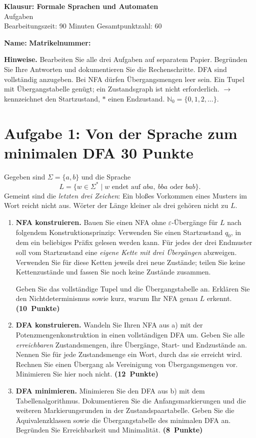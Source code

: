 \documentclass[11pt,a4paper]{article}
\newif\ifloesungen
\newcommand{\punkte}[1]{\hfill\mbox{\textbf{(#1 Punkte)}}}
\begin{document}
\begin{center}
{\LARGE\bfseries Klausur: Formale Sprachen und Automaten}\\[6pt]
{\large\ifloesungen Aufgaben und separate Musterlösungen\else Aufgaben\fi}\\[5pt]
Bearbeitungszeit: 90 Minuten \quad Gesamtpunktzahl: 60
\end{center}
\textbf{Name:} \hrulefill\quad\textbf{Matrikelnummer:} \hrulefill

\textbf{Hinweise.} Bearbeiten Sie alle drei Aufgaben auf separatem Papier.
Begründen Sie Ihre Antworten und dokumentieren Sie die Rechenschritte.
DFA sind vollständig anzugeben. Bei NFA dürfen Übergangsmengen leer sein.
Ein Tupel mit Übergangstabelle genügt; ein Zustandsgraph ist nicht erforderlich.
$\to$ kennzeichnet den Startzustand, $*$ einen Endzustand.
$\mathbb N_0=\{0,1,2,\ldots\}$.

\section*{Aufgabe 1: Von der Sprache zum minimalen DFA \hfill 30 Punkte}
Gegeben sind $\Sigma=\{a,b\}$ und die Sprache
\[
 L=\{w\in\Sigma^*\mid w\text{ endet auf }aba,\ bba\text{ oder }bab\}.
\]
Gemeint sind die \emph{letzten drei Zeichen}: Ein bloßes Vorkommen eines
Musters im Wort reicht nicht aus. Wörter der Länge kleiner als drei gehören
nicht zu $L$.

\begin{enumerate}[label=\alph*)]
\item \textbf{NFA konstruieren.} Bauen Sie einen NFA ohne
$\varepsilon$-Übergänge für $L$ nach folgendem Konstruktionsprinzip:
Verwenden Sie einen Startzustand $q_0$, in dem ein beliebiges Präfix gelesen
werden kann. Für jedes der drei Endmuster soll vom Startzustand eine
\emph{eigene Kette mit drei Übergängen} abzweigen. Verwenden Sie für diese
Ketten jeweils drei neue Zustände; teilen Sie keine Kettenzustände und
fassen Sie noch keine Zustände zusammen.

Geben Sie das vollständige Tupel und die Übergangstabelle an.
Erklären Sie den Nichtdeterminismus sowie kurz, warum Ihr NFA genau $L$
erkennt. \punkte{10}

\item \textbf{DFA konstruieren.} Wandeln Sie Ihren NFA aus a) mit der
Potenzmengenkonstruktion in einen vollständigen DFA um. Geben Sie alle
\emph{erreichbaren} Zustandsmengen, ihre Übergänge, Start- und Endzustände an.
Nennen Sie für jede Zustandsmenge ein Wort, durch das sie erreicht wird.
Rechnen Sie einen Übergang als Vereinigung von Übergangsmengen vor.
Minimieren Sie hier noch nicht. \punkte{12}

\item \textbf{DFA minimieren.} Minimieren Sie den DFA aus b) mit dem
Tabellenalgorithmus. Dokumentieren Sie die Anfangsmarkierungen und die
weiteren Markierungsrunden in der Zustandspaartabelle. Geben Sie die
Äquivalenzklassen sowie die Übergangstabelle des minimalen DFA an.
Begründen Sie Erreichbarkeit und Minimalität. \punkte{8}
\end{enumerate}
\end{document}
